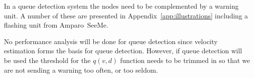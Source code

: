 In a queue detection system the nodes need to be complemented by a warning unit. A number of these are presented in \mbox{Appendix~\ref{app:illustrations}} including a flashing unit from \mbox{Amparo SeeMe\mtm}.

No performance analysis will be done for queue detection since velocity estimation forms the basis for queue detection. However, if queue detection will be used the threshold for the  $q(v,d)$ function needs to be trimmed in so that we are not sending a warning too often, or too seldom.
